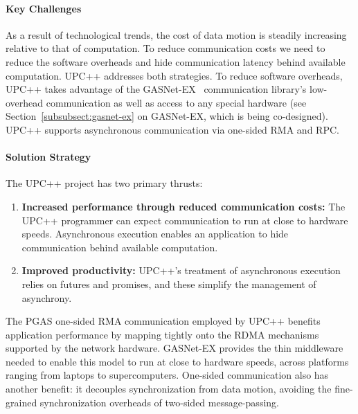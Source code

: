 \paragraph{Key  Challenges}

As a result of technological trends, the cost of data motion is steadily increasing relative to that of computation.  To reduce communication costs we need to 
reduce the software overheads and hide communication latency behind available computation. UPC++ addresses both strategies.
To reduce software overheads, UPC++ takes advantage of the GASNet-EX~\cite{gasnet-lcpc18,gasnet-site}
communication library's 
low-overhead communication as well as access to any special hardware
(see Section~\ref{subsubsect:gasnet-ex} on GASNet-EX, which is being co-designed).
UPC++ supports asynchronous communication via one-sided RMA and RPC.



\paragraph{Solution Strategy}

The UPC++ project has two primary thrusts:
\begin{enumerate}
\item \textbf{Increased performance through reduced communication costs:} The
UPC++ programmer can expect communication to run at close to hardware speeds.
Asynchronous execution enables an application to hide communication behind
available computation.

\item \textbf{Improved productivity:}  UPC++'s treatment of asynchronous
execution relies on futures and promises, and these simplify the management of
asynchrony.

\end{enumerate}

The PGAS one-sided RMA communication employed by UPC++
benefits application  performance by mapping tightly onto the RDMA mechanisms
supported by the network hardware. GASNet-EX provides the
thin middleware
needed to enable this model to run at close to hardware speeds, across platforms ranging from laptops to supercomputers.
One-sided communication also has another benefit:
it decouples synchronization from data motion,
avoiding the fine-grained synchronization overheads of two-sided message-passing.

